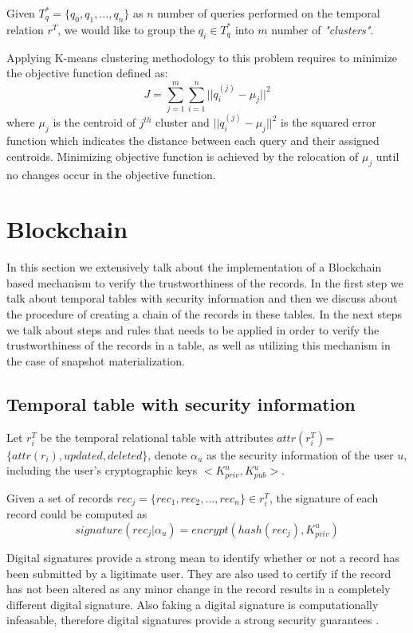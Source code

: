 			\begin{prop} 
				Given $T_q^* = \{q_0,q_1,...,q_n\}$ as $n$ number of queries performed on the temporal relation $r^T$, we would like to group the $q_i \in T_q^*$ into $m$ number of \textit{"clusters"}. 
			\label{prop:heuristic_method}
			\end{prop}
			Applying K-means clustering methodology to this problem requires to minimize the objective function defined as:
			$$J = \sum_{j=1}^{m} \sum_{i=1}^{n} ||q_i^{(j)}-\mu_j||^2$$
			where $\mu_j$ is the centroid of $j^{th}$ cluster and $||q_i^{(j)}-\mu_j||^2$ is the squared error function which indicates the distance between each query and their assigned centroids.
			Minimizing objective function is achieved by the relocation of $\mu_j$ until no changes occur in the objective function.

	\section{Blockchain}
		In this section we extensively talk about the implementation of a Blockchain based mechanism to verify the trustworthiness of the records. In the first step we talk about temporal tables with security information and then we discuss about the procedure of creating a chain of the records in these tables. In the next steps we talk about steps and rules that needs to be applied in order to verify the trustworthiness of the records in a table, as well as utilizing this mechanism in the case of snapshot materialization.

		\subsection{Temporal table with security information}
			Let $r_i^T$ be the temporal relational table with attributes $attr(r_i^T)$=$\{attr(r_i), updated,deleted\}$, denote $\alpha_u$ as the security information of the user $u$, including the user's cryptographic keys $<K_{priv}^u, K_{pub}^u>$.


			\begin{defn} 
				Given a set of records $rec_j =\{rec_1,rec_2,...,rec_n\} \in r_i^T$, the signature of each record could be computed as $$signature(rec_j|\alpha_u)= encrypt(hash(rec_j),K_{priv}^u)$$  
			\label{defn:digital_signature}
			\end{defn}

			Digital signatures provide a strong mean to identify whether or not a record has been submitted by a ligitimate user. They are also used to certify if the record has not been altered as any minor change in the record results in a completely different digital signature. Also faking a digital signature is computationally infeasable, therefore digital signatures provide a strong security guarantees \cite{katz2010digital}.

